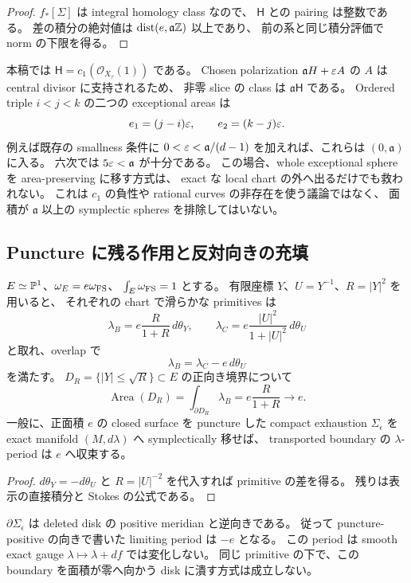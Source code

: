 \begin{proof}
$f_*[\Sigma]$ は integral homology class なので、
$\mathsf H$ との pairing は整数である。
差の積分の絶対値は $\operatorname{dist}(e,\mathfrak a\mathbb Z)$ 以上であり、
前の系と同じ積分評価で norm の下限を得る。
\end{proof}

本稿では $\mathsf H=c_1(\mathcal O_{X_\tau}(1))$ である。
Chosen polarization $\mathfrak aH+\varepsilon A$ の $A$ は central divisor に支持されるため、
非零 slice の class は $\mathfrak a\mathsf H$ である。
Ordered triple $i<j<k$ の二つの exceptional areas は
\[
 e_1=(j-i)\varepsilon,\qquad e_2=(k-j)\varepsilon.
\]
例えば既存の smallness 条件に
$0<\varepsilon<\mathfrak a/(d-1)$ を加えれば、これらは $(0,\mathfrak a)$ に入る。
六次では $5\varepsilon<\mathfrak a$ が十分である。
この場合、whole exceptional sphere を area-preserving に移す方式は、
exact な local chart の外へ出るだけでも救われない。
これは $c_1$ の負性や rational curves の非存在を使う議論ではなく、
面積が $\mathfrak a$ 以上の symplectic spheres を排除してはいない。

\subsection{Puncture に残る作用と反対向きの充填}

\begin{proposition}
\label{exm:puncture-period}
$E\simeq\mathbb P^1$、$\omega_E=e\omega_{\rm FS}$、
$\int_E\omega_{\rm FS}=1$ とする。
有限座標 $Y$、$U=Y^{-1}$、$R=|Y|^2$ を用いると、
それぞれの chart で滑らかな primitives は
\[
 \lambda_B=e\frac{R}{1+R}\,d\theta_Y,
 \qquad
 \lambda_C=e\frac{|U|^2}{1+|U|^2}\,d\theta_U
\]
と取れ、overlap で
\[
 \lambda_B=\lambda_C-e\,d\theta_U
\]
を満たす。
$D_R=\{|Y|\le\sqrt R\}\subset E$ の正向き境界について
\[
 \operatorname{Area}(D_R)
 =\int_{\partial D_R}\lambda_B
 =e\frac{R}{1+R}\longrightarrow e.
\]
一般に、正面積 $e$ の closed surface を puncture した compact exhaustion
$\Sigma_\epsilon$ を exact manifold $(M,d\lambda)$ へ symplectically 移せば、
transported boundary の $\lambda$-period は $e$ へ収束する。
\end{proposition}

\begin{proof}
$d\theta_Y=-d\theta_U$ と $R=|U|^{-2}$ を代入すれば primitive の差を得る。
残りは表示の直接積分と Stokes の公式である。
\end{proof}

$\partial\Sigma_\epsilon$ は deleted disk の positive meridian と逆向きである。
従って puncture-positive の向きで書いた limiting period は $-e$ となる。
この period は smooth exact gauge $\lambda\mapsto\lambda+df$ では変化しない。
同じ primitive の下で、この boundary を面積が零へ向かう disk に潰す方式は成立しない。

